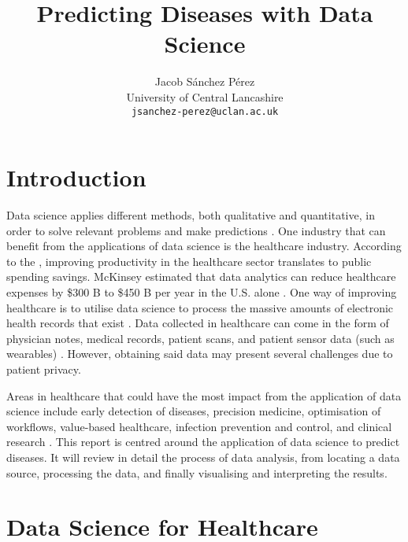 \documentclass[a4paper,12pt]{article}
\title{Predicting Diseases with Data Science}
\author{Jacob Sánchez Pérez\\ University of Central Lancashire\\\texttt{jsanchez-perez@uclan.ac.uk}}
\date{}
\begin{document}
\maketitle


\section{Introduction}



Data science applies different methods, both qualitative and quantitative, in order to solve relevant problems and make predictions \parencite[78]{Waller2013}.
One industry that can benefit from the applications of data science is the healthcare industry.
According to the \textcite{oecd2010health}, improving productivity in the healthcare sector translates to public spending savings.
McKinsey estimated that data analytics can reduce healthcare expenses by \$300 B to \$450 B per year in the U.S. alone \parencite{Groves2013}.
One way of improving healthcare is to utilise data science to process the massive amounts of electronic health records that exist \parencite{Dalianis2015}.
Data collected in healthcare can come in the form of physician notes, medical records, patient scans, and patient sensor data (such as wearables) \parencite{Adam2017}.
However, obtaining said data may present several challenges due to patient privacy. 

Areas in healthcare that could have the most impact from the application of data science include early detection of diseases, precision medicine, optimisation of workflows, value-based healthcare, infection prevention and control, and clinical research \parencite[9]{Consoli2019}.
This report is centred around the application of data science to predict diseases.
It will review in detail the process of data analysis, from locating a data source, processing the data, and finally visualising and interpreting the results.

\section{Data Science for Healthcare}

\end{document}
